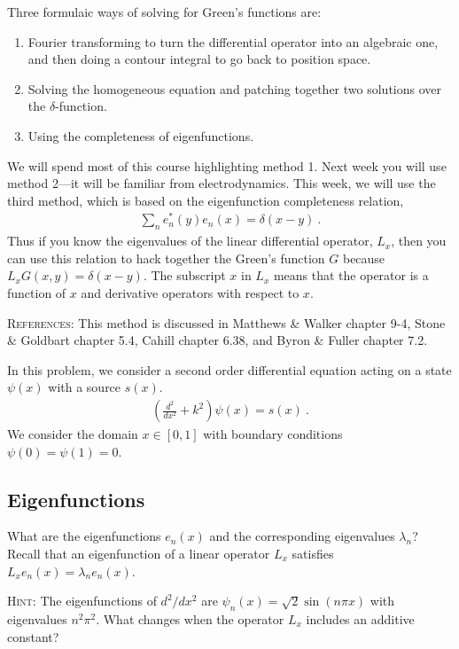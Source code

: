 \documentclass[12pt]{article}
\numberwithin{equation}{section}    %
\begin{document}
Three formulaic ways of solving for Green's functions are:
\begin{enumerate}
	\item Fourier transforming to turn the differential operator into an algebraic one, and then doing a contour integral to go back to position space.
	\item Solving the homogeneous equation and patching together two solutions over the $\delta$-function. 
	\item Using the completeness of eigenfunctions.
\end{enumerate}
We will spend most of this course highlighting method 1. Next week you will use method 2---it will be familiar from electrodynamics. This week, we will use the third method, which is based on the eigenfunction completeness relation,
\begin{align}
	\sum_n e_n^*(y) e_n(x) = \delta(x-y) \ .
\end{align}
Thus if you know the eigenvalues of the linear differential operator, $L_x$, then you can use this relation to hack together the Green's function $G$ because $L_x G(x,y) = \delta(x-y)$.  The subscript $x$ in $L_x$ means that the operator is a function of $x$ and derivative operators with respect to $x$.

\textsc{References}: This method is discussed in  Matthews \& Walker chapter 9-4, Stone \& Goldbart chapter 5.4, Cahill chapter 6.38, and Byron \& Fuller chapter 7.2. 

In this problem, we consider a second order differential equation acting on a state $\psi(x)$ with a source $s(x)$. 
\begin{align*}
	\left(\frac{d^2}{dx^2} + k^2 \right) \psi(x) = s(x) \ .
\end{align*}
We consider the domain $x\in[0,1]$ with boundary conditions $\psi(0) = \psi(1) = 0$.

\subsection{Eigenfunctions}

What are the eigenfunctions $e_n(x)$ and the corresponding eigenvalues $\lambda_n$? Recall that an eigenfunction of a linear operator $L_x$ satisfies $L_x e_n(x) = \lambda_n e_n(x)$. 


\textsc{Hint:} The eigenfunctions of $d^2/dx^2$ are $\psi_n(x) = \sqrt{2} \sin (n\pi x)$ with eigenvalues $n^2 \pi^2$. What changes when the operator $L_x$ includes an additive constant?
\end{document}
